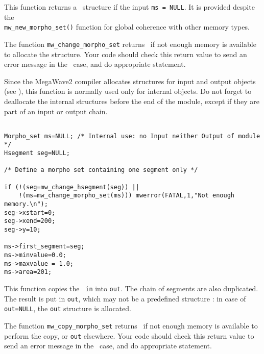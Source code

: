 \Description
This function returns a \mset\ structure if the input \verb+ms = NULL+.
It is provided despite the \\
\verb+mw_new_morpho_set()+ function for
global coherence with other memory types.

The function \verb+mw_change_morpho_set+ returns \Null\ if not enough memory is available to allocate the structure. 
Your code should check this return value to send an error message in the \Null\ case, and do appropriate statement.

Since the MegaWave2 compiler allocates structures for input and output 
objects (see \volI), this function is normally used only for internal objects.
Do not forget to deallocate the internal structures before the end
of the module, except if they are part of an input or output chain.

\Next
\Example
\begin{verbatim}

Morpho_set ms=NULL; /* Internal use: no Input neither Output of module */
Hsegment seg=NULL;

/* Define a morpho set containing one segment only */

if (!(seg=mw_change_hsegment(seg)) ||
    !(ms=mw_change_morpho_set(ms))) mwerror(FATAL,1,"Not enough memory.\n");
seg->xstart=0; 
seg->xend=200;
seg->y=10;

ms->first_segment=seg;
ms->minvalue=0.0;
ms->maxvalue = 1.0;
ms->area=201;

\end{verbatim}

\newpage %


\Description
This function copies the \mset\ \verb+in+ into \verb+out+.
The chain of segments are also duplicated.
The result is put in \verb+out+, which may not be a predefined structure : in case 
of \verb+out=NULL+, the \verb+out+ structure is allocated.

The function \verb+mw_copy_morpho_set+ returns \Null\ if not enough memory is available to perform
the copy, or \verb+out+ elsewhere.
Your code should check this return value to send an error message in the \Null\ case, and do appropriate statement.

